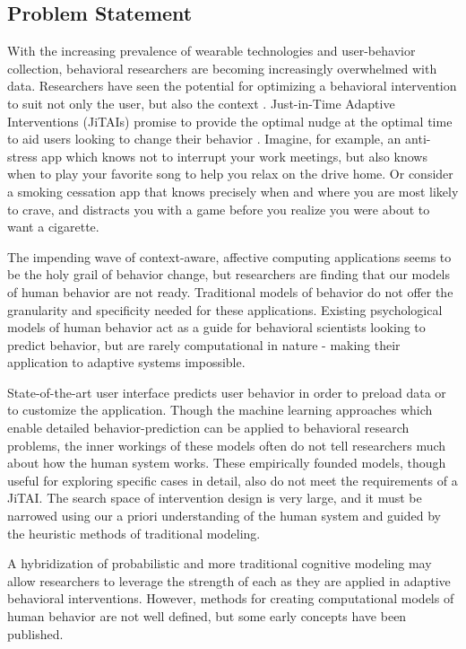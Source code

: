 \documentclass[conference]{IEEEtran}
\begin{document}
\subsection{Problem Statement}
With the increasing prevalence of wearable technologies and user-behavior collection, behavioral researchers are becoming increasingly overwhelmed with data.
Researchers have seen the potential for optimizing a behavioral intervention to suit not only the user, but also the context \cite{brailsford2010towards, collins2004}. 
Just-in-Time Adaptive Interventions (JiTAIs) promise to provide the optimal nudge at the optimal time to aid users looking to change their behavior \cite{nahum2014}.
Imagine, for example, an anti-stress app which knows not to interrupt your work meetings, but also knows when to play your favorite song to help you relax on the drive home.
Or consider a smoking cessation app that knows precisely when and where you are most likely to crave, and distracts you with a game before you realize you were about to want a cigarette.

The impending wave of context-aware\cite{schilit1994context}, affective computing\cite{picard2000affective} applications seems to be the holy grail of behavior change, but researchers are finding that our models of human behavior are not ready.
Traditional models of behavior do not offer the granularity and specificity needed for these applications\cite{riley2011health}.
Existing psychological models of human behavior act as a guide for behavioral scientists looking to predict behavior, but are rarely computational in nature - making their application to adaptive systems impossible.

State-of-the-art user interface predicts user behavior in order to preload data or to customize the application.
Though the machine learning approaches which enable detailed behavior-prediction can be applied to behavioral research problems, the inner workings of these models often do not tell researchers much about how the human system works. 
These empirically founded models, though useful for exploring specific cases in detail, also do not meet the requirements of a JiTAI.
The search space of intervention design is very large, and it must be narrowed using our a priori understanding of the human system and guided by the heuristic methods of traditional modeling.

A hybridization of probabilistic and more traditional cognitive modeling may allow researchers to leverage the strength of each as they are applied in adaptive behavioral interventions.
However, methods for creating computational models of human behavior are not well defined, but some early concepts have been published.
\end{document}
